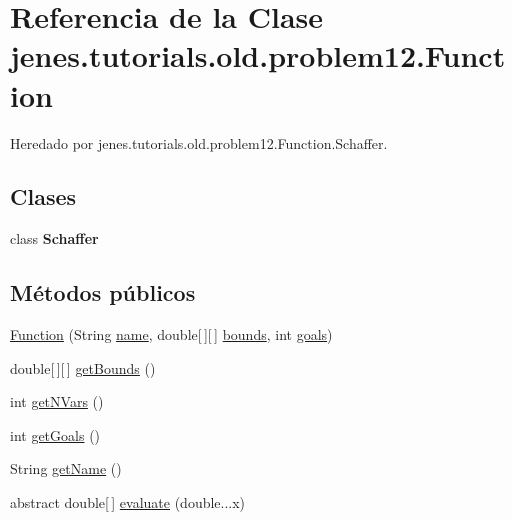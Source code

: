 \hypertarget{classjenes_1_1tutorials_1_1old_1_1problem12_1_1_function}{\section{Referencia de la Clase jenes.\-tutorials.\-old.\-problem12.\-Function}
\label{classjenes_1_1tutorials_1_1old_1_1problem12_1_1_function}
}


Heredado por jenes.\-tutorials.\-old.\-problem12.\-Function.\-Schaffer.

\subsection*{Clases}
\begin{DoxyCompactItemize}
\item 
class {\bfseries Schaffer}
\end{DoxyCompactItemize}
\subsection*{Métodos públicos}
\begin{DoxyCompactItemize}
\item 
\hyperlink{classjenes_1_1tutorials_1_1old_1_1problem12_1_1_function_a9c5f78b0b4d831eebec0071baa79f8ee}{Function} (String \hyperlink{classjenes_1_1tutorials_1_1old_1_1problem12_1_1_function_a6cc32f98e4932a3251cbaffdf08b9773}{name}, double\mbox{[}$\,$\mbox{]}\mbox{[}$\,$\mbox{]} \hyperlink{classjenes_1_1tutorials_1_1old_1_1problem12_1_1_function_a0a732b2084fd09b6d69858b21a780a05}{bounds}, int \hyperlink{classjenes_1_1tutorials_1_1old_1_1problem12_1_1_function_a9ad846e268721b5a9d5d3e15763d5400}{goals})
\item 
double\mbox{[}$\,$\mbox{]}\mbox{[}$\,$\mbox{]} \hyperlink{classjenes_1_1tutorials_1_1old_1_1problem12_1_1_function_ae97b45b0a6c1d5db782a138e06d2f076}{get\-Bounds} ()
\item 
int \hyperlink{classjenes_1_1tutorials_1_1old_1_1problem12_1_1_function_af412a211a5270eb27376db8cd0bc704d}{get\-N\-Vars} ()
\item 
int \hyperlink{classjenes_1_1tutorials_1_1old_1_1problem12_1_1_function_ae5415395c7c1fde07fbc5581afa0273c}{get\-Goals} ()
\item 
String \hyperlink{classjenes_1_1tutorials_1_1old_1_1problem12_1_1_function_a48a0197bf768aca5fc8154613cd30e8d}{get\-Name} ()
\item 
abstract double\mbox{[}$\,$\mbox{]} \hyperlink{classjenes_1_1tutorials_1_1old_1_1problem12_1_1_function_aa1f4a7947b903e4ae9b9617940d4ed03}{evaluate} (double...\-x)
\end{DoxyCompactItemize}
